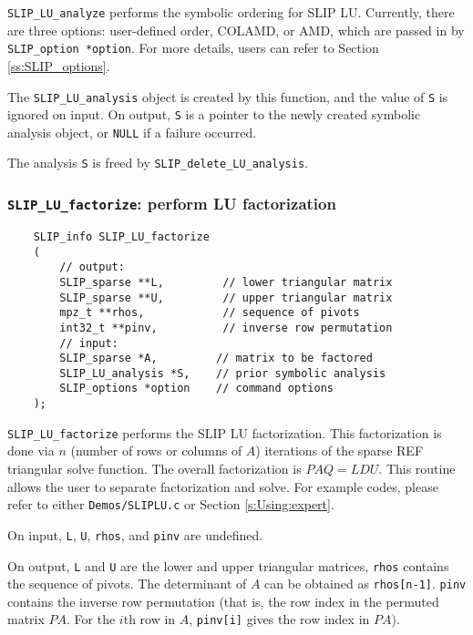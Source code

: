 \documentclass[12pt]{article}
\theoremstyle{definition}
\begin{document}
\verb|SLIP_LU_analyze| performs the symbolic ordering for SLIP LU. Currently,
there are three options: user-defined order, COLAMD, or AMD, which are passed
in by \verb|SLIP_option *option|. For more details, users can refer to Section
\ref{ss:SLIP_options}.

The \verb|SLIP_LU_analysis| object is created by this function, and the value
of \verb|S| is ignored on input.  On output, \verb|S| is a pointer to the newly
created symbolic analysis object, or \verb|NULL| if a failure occurred.

The analysis \verb|S| is freed by \verb|SLIP_delete_LU_analysis|.

\cprotect\subsubsection{\verb|SLIP_LU_factorize|: perform LU factorization}
\label{ss:SLIP_LU_factorize}

\begin{mdframed}[userdefinedwidth=6in]
{\footnotesize
\begin{verbatim}
    SLIP_info SLIP_LU_factorize
    (
        // output:
        SLIP_sparse **L,         // lower triangular matrix
        SLIP_sparse **U,         // upper triangular matrix
        mpz_t **rhos,            // sequence of pivots
        int32_t **pinv,          // inverse row permutation
        // input:
        SLIP_sparse *A,         // matrix to be factored
        SLIP_LU_analysis *S,    // prior symbolic analysis
        SLIP_options *option    // command options
    );
\end{verbatim}
} \end{mdframed}

\verb|SLIP_LU_factorize| performs the SLIP LU factorization. This factorization
is done via $n$ (number of rows or columns of $A$) iterations of the sparse
REF triangular solve function. The overall factorization is $PAQ = LDU$.  This
routine allows the user to separate factorization and solve. For example codes,
please refer to either \verb|Demos/SLIPLU.c| or Section \ref{s:Using:expert}.

On input, \verb|L|, \verb|U|, \verb|rhos|, and \verb|pinv| are undefined.

On output, \verb|L| and \verb|U| are the lower and upper triangular matrices,
\verb|rhos| contains the sequence of pivots. The determinant of $A$ can be
obtained as \verb|rhos[n-1]|. \verb|pinv| contains the inverse row permutation
(that is, the row index in the permuted matrix $PA$. For the $i$th row in $A$,
\verb|pinv[i]| gives the row index in $PA$).
\end{document}
